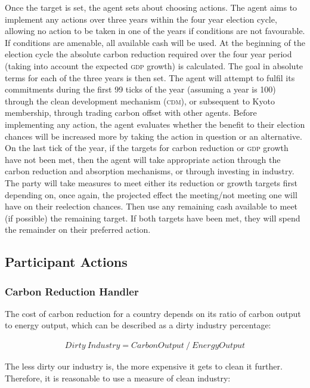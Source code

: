 Once the target is set, the agent sets about choosing actions. The agent aims to implement any actions over three years within the four year election cycle, allowing no action to be taken in one of the years if conditions are not favourable. If conditions are amenable, all available cash will be used. At the beginning of the election cycle the absolute carbon reduction required over the four year period (taking into account the expected \textsc{gdp} growth) is calculated. The goal in absolute terms for each of the three years is then set. The agent will attempt to fulfil its commitments during the first 99 ticks of the year (assuming a year is 100) through the clean development mechanism (\textsc{cdm}), or subsequent to Kyoto membership, through trading carbon offset with other agents. Before implementing any action, the agent evaluates whether the benefit to their election chances will be increased more by taking the action in question or an alternative. On the last tick of the year, if the targets for carbon reduction or \textsc{gdp} growth have not been met, then the agent will take appropriate action through the carbon reduction and absorption mechanisms, or through investing in industry. The party will take measures to meet either its reduction or growth targets first depending on, once again, the projected effect the meeting/not meeting one will have on their reelection chances. Then use any remaining cash available to meet (if possible) the remaining target. If both targets have been met, they will spend the remainder on their preferred action.

\subsection{Participant Actions}

\subsubsection{Carbon Reduction Handler}

The cost of carbon reduction for a country depends on its ratio of carbon output to energy output, which can be described as a dirty industry percentage:

\begin{align*}
Dirty~Industry = Carbon Output~/~Energy Output
\end{align*}

The less dirty our industry is, the more expensive it gets to clean it further. Therefore, it is reasonable to use a measure of clean industry:

